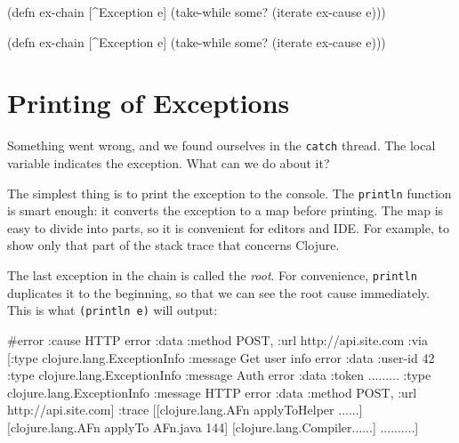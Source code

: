 \begin{english}
  \begin{clojure}
(defn ex-chain [^Exception e]
  (take-while some?
    (iterate ex-cause e)))
  \end{clojure}
\end{english}

\else

\begin{english}
  \begin{clojure}
(defn ex-chain [^Exception e]
  (take-while some? (iterate ex-cause e)))
  \end{clojure}
\end{english}

\fi

\section{Printing of Exceptions}

Something went wrong, and we found ourselves in the \verb|catch| thread. The local variable indicates the exception. What can we do about it?

The simplest thing is to print the exception to the console. The \verb|println| function is smart enough: it converts the exception to a map before printing. The map is easy to divide into parts, so it is convenient for editors and IDE. For example, to show only that part of the stack trace that concerns Clojure.

The last exception in the chain is called the \emph{root}. For convenience, \verb|println| duplicates it to the beginning, so that we can see the root cause immediately. This is what \verb|(println e)| will output:


 \ifx\DEVICETYPE\MOBILE

\begin{english}
  \begin{clojure}
#error {
 :cause HTTP error
 :data {:method POST,
        :url http://api.site.com}
 :via
 [{:type clojure.lang.ExceptionInfo
   :message Get user info error
   :data {:user-id 42}}
  {:type clojure.lang.ExceptionInfo
   :message Auth error
   :data {:token .........}}
  {:type clojure.lang.ExceptionInfo
   :message HTTP error
   :data {:method POST,
          :url http://api.site.com}}]
 :trace
 [[clojure.lang.AFn applyToHelper ......]
  [clojure.lang.AFn applyTo AFn.java 144]
  [clojure.lang.Compiler......]
  ..........]}
  \end{clojure}
\end{english}

